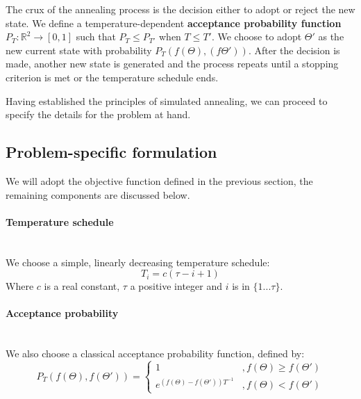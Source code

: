 \documentclass[12pt]{scrartcl}
\newcommand{\R}{\mathbb{R}}
\begin{document}
The crux of the annealing process is the decision either to adopt or reject the new state. We define a temperature-dependent \textbf{acceptance probability function} $P_T:\R^2 \rightarrow [0,1]$ such that $P_T \leq P_{T'}$ when $T \leq T'$. We choose to adopt $\Theta'$ as the new current state with probability $P_T(f(\Theta),(f\Theta'))$. After the decision is made, another new state is generated and the process repeats until a stopping criterion is met or the temperature schedule ends.

Having established the principles of simulated annealing, we can proceed to specify the details for the problem at hand. 

\subsection{Problem-specific formulation}
We will adopt the objective function defined in the previous section, the remaining components are discussed below.

\paragraph{Temperature schedule}\mbox{}\\
We choose a simple, linearly decreasing temperature schedule:
\[T_i = c(\tau-i+1)\]
Where $c$ is a real constant, $\tau$ a positive integer and $i$ is in $\{1...\tau\}$. 

\paragraph{Acceptance probability}\mbox{}\\
We also choose a classical acceptance probability function, defined by:
\[ P_T(f(\Theta),f(\Theta')) = 
 \left\{ \begin{array}{cc} 
1 & ,f(\Theta) \geq f(\Theta') \\
  e^{(f(\Theta) - f(\Theta'))T^{-1}} & ,f(\Theta) < f(\Theta')
\end{array} \right. \]
\end{document}
